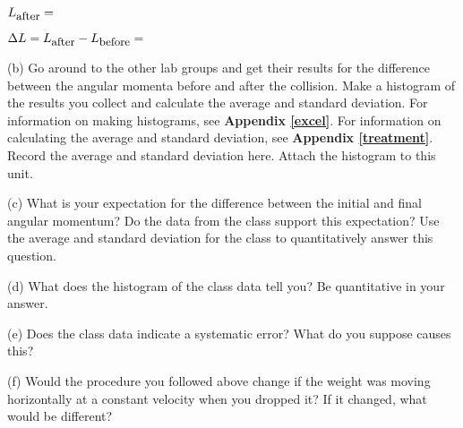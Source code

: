 \( L_{\mbox{\small after}}= \)
\vspace{5mm}

\( \Delta L= L_{\mbox{\small after}} - L_{\mbox{\small before}} = \)  
\vspace{5mm}

(b) Go around to the other lab groups and get their results for the difference between the angular momenta before and after the collision.
Make a histogram of the results you collect and calculate the average and standard deviation.
For information on making histograms, see \textbf{Appendix \ref{excel}}. For information on calculating the average and standard deviation, see \textbf{Appendix \ref{treatment}}. 
Record the average and standard deviation here. Attach the histogram to this unit.
\vspace{25mm}



(c) What is your expectation for the difference between the initial and final angular momentum?
Do the data from the class support this expectation? 
Use the average and standard deviation for the class to quantitatively answer this question.
\vspace{25mm}

(d) What does the histogram of the class data tell you? Be quantitative in your answer.
\vspace{25mm}

(e) Does the class data indicate a systematic error?  What do you suppose causes this?
\vspace{25mm}

(f) Would the procedure you followed above change if the weight was moving horizontally at a constant velocity when you dropped it? 
If it changed, what would be different?
\vspace{20mm}

